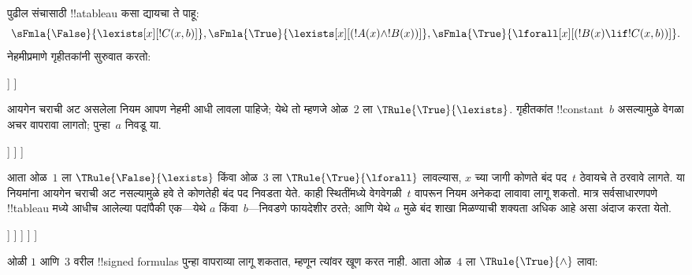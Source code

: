 \documentclass[../../../include/open-logic-section]{subfiles}
\begin{document}
\begin{ex}
पुढील संचासाठी !!a{tableau} कसा द्यायचा ते पाहू:
\[
\sFmla{\False}{\lexists[x][!C(x,b)]},
\sFmla{\True}{\lexists[x][(!A(x) \land !B(x))]},
\sFmla{\True}{\lforall[x][(!B(x) \lif !C(x,b))]}.
\]
नेहमीप्रमाणे गृहीतकांनी सुरुवात करतो:
\begin{oltableau}
  [\sFmla{\False}{\lexists[x][\formula{C}(x,b)]}, just=\TAss
    [\sFmla{\True}{\lexists[x][(\formula{A}(x) \land \formula{B}(x))]},
      just=\TAss
      [\sFmla{\True}{\lforall[x][(\formula{B}(x) \lif \formula{C}(x,b))]},
        just=\TAss]
    ]
  ]
\end{oltableau}
आयगेन चराची अट असलेला नियम आपण नेहमी आधी लावला पाहिजे; येथे तो म्हणजे
ओळ~$2$ ला $\TRule{\True}{\lexists}$. गृहीतकांत !!{constant}~$b$ असल्यामुळे
वेगळा अचर वापरावा लागतो; पुन्हा~$a$ निवडू या.
\begin{oltableau}
  [\sFmla{\False}{\lexists[x][\formula{C}(x,b)]}, just=\TAss
    [\sFmla{\True}{\lexists[x][(\formula{A}(x) \land \formula{B}(x))]},
      just=\TAss, checked
      [\sFmla{\True}{\lforall[x][(\formula{B}(x) \lif \formula{C}(x,b))]},
        just=\TAss
        [\sFmla{\True}{\formula{A}(a) \land \formula{B}(a)},
          just={\TRule{\True}{\lexists}[2]}]
      ]
    ]
  ]
\end{oltableau}
आता ओळ~$1$ ला $\TRule{\False}{\lexists}$ किंवा ओळ~$3$ ला
$\TRule{\True}{\lforall}$ लावल्यास, $x$ च्या जागी कोणते बंद पद~$t$ ठेवायचे
ते ठरवावे लागते. या नियमांना आयगेन चराची अट नसल्यामुळे हवे ते कोणतेही बंद
पद निवडता येते. काही स्थितींमध्ये वेगवेगळी~$t$ वापरून नियम अनेकदा लावावा
लागू शकतो. मात्र सर्वसाधारणपणे !!{tableau} मध्ये आधीच आलेल्या पदांपैकी
एक---येथे $a$ किंवा~$b$---निवडणे फायदेशीर ठरते; आणि येथे $a$ मुळे बंद
शाखा मिळण्याची शक्यता अधिक आहे असा अंदाज करता येतो.
\begin{oltableau}
  [\sFmla{\False}{\lexists[x][\formula{C}(x,b)]}, just=\TAss
    [\sFmla{\True}{\lexists[x][(\formula{A}(x) \land \formula{B}(x))]},
      just=\TAss, checked
      [\sFmla{\True}{\lforall[x][(\formula{B}(x) \lif \formula{C}(x,b))]}, just=\TAss
        [\sFmla{\True}{\formula{A}(a) \land \formula{B}(a)}, just={\TRule{\True}{\lexists}[2]}
          [\sFmla{\False}{\formula{C}(a,b)}, just={\TRule{\False}{\lexists}[1]}
            [\sFmla{\True}{\formula{B}(a) \lif \formula{C}(a,b)},
              just={\TRule{\True}{\lforall}[3]}
            ]
          ]
        ]
      ]
    ]
  ]
\end{oltableau}
ओळी $1$ आणि~$3$ वरील !!{signed formula}s पुन्हा वापराव्या लागू शकतात,
म्हणून त्यांवर खूण करत नाही. आता ओळ~$4$ ला $\TRule{\True}{\land}$ लावा:

\end{ex}
\end{document}
